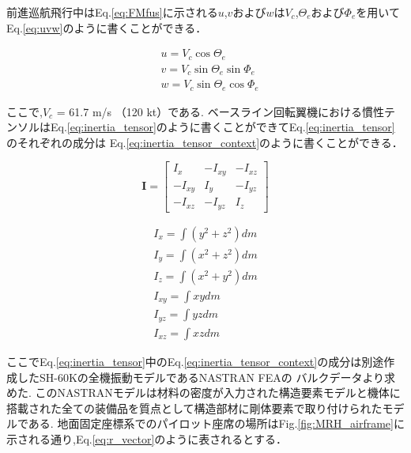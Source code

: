     前進巡航飛行中はEq.\eqref{eq:FMfus}に示される$u$,$v$および$w$は$V_c$,$\Theta_e$および$\Phi_e$を用いてEq.\eqref{eq:uvw}のように書くことができる．


    \begin{equation}
        \begin{aligned}
        & u=V_c \cos \Theta_e \\
        & v=V_c \sin \Theta_e \sin \Phi_e \\
        & w=V_c \sin \Theta_e \cos \Phi_e
        \end{aligned}
        \label{eq:uvw}
    \end{equation}

    ここで,$V_c$ = 61.7 m/s （120 kt）である.
    ベースライン回転翼機における慣性テンソルはEq.\eqref{eq:inertia_tensor}のように書くことができてEq.\eqref{eq:inertia_tensor}のそれぞれの成分は
    Eq.\eqref{eq:inertia_tensor_context}のように書くことができる．

    \begin{equation}
        \boldsymbol{I}=\left[\begin{array}{ccc}
        I_x & -I_{x y} & -I_{x z} \\
        -I_{x y} & I_y & -I_{y z} \\
        -I_{x z} & -I_{y z} & I_z
        \end{array}\right]
        \label{eq:inertia_tensor}
    \end{equation}

    \begin{equation}
        \begin{gathered}
        I_x=\int\left(y^2+z^2\right) d m \\
        I_y=\int\left(x^2+z^2\right) d m \\
        I_z=\int\left(x^2+y^2\right) d m \\
        I_{x y}=\int x y d m \\
        I_{y z}=\int y z d m \\
        I_{x z}=\int x z d m
        \end{gathered}
        \label{eq:inertia_tensor_context}
    \end{equation}


    ここでEq.\eqref{eq:inertia_tensor}中のEq.\eqref{eq:inertia_tensor_context}の成分は別途作成したSH-60Kの全機振動モデルであるNASTRAN FEAの
    バルクデータより求めた.
    このNASTRANモデルは材料の密度が入力された構造要素モデルと機体に搭載された全ての装備品を質点として構造部材に剛体要素で取り付けられたモデルである.
    地面固定座標系でのパイロット座席の場所はFig.\ref{fig:MRH_airframe}に示される通り,Eq.\eqref{eq:r_vector}のように表されるとする．


